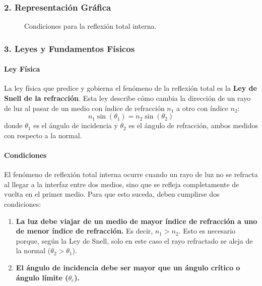 \subsubsection*{2. Representación Gráfica}
\begin{figure}[H]
    \centering
    \caption{Condiciones para la reflexión total interna.}
\end{figure}

\subsubsection*{3. Leyes y Fundamentos Físicos}
\paragraph{Ley Física}
La ley física que predice y gobierna el fenómeno de la reflexión total es la \textbf{Ley de Snell de la refracción}. Esta ley describe cómo cambia la dirección de un rayo de luz al pasar de un medio con índice de refracción $n_1$ a otro con índice $n_2$:
$$ n_1 \sin(\theta_1) = n_2 \sin(\theta_2) $$
donde $\theta_1$ es el ángulo de incidencia y $\theta_2$ es el ángulo de refracción, ambos medidos con respecto a la normal.

\paragraph{Condiciones}
El fenómeno de reflexión total interna ocurre cuando un rayo de luz no se refracta al llegar a la interfaz entre dos medios, sino que se refleja completamente de vuelta en el primer medio. Para que esto suceda, deben cumplirse dos condiciones:
\begin{enumerate}
    \item \textbf{La luz debe viajar de un medio de mayor índice de refracción a uno de menor índice de refracción.} Es decir, $n_1 > n_2$. Esto es necesario porque, según la Ley de Snell, solo en este caso el rayo refractado se aleja de la normal ($\theta_2 > \theta_1$).
    \item \textbf{El ángulo de incidencia debe ser mayor que un ángulo crítico o ángulo límite ($\theta_c$).}
\end{enumerate}

